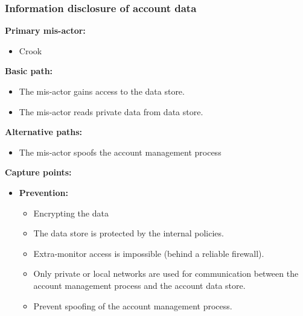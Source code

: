 \documentclass[a4paper,11pt]{report}
\begin{document}
\subsubsection{Information disclosure of account data}
\label{AccountDataCasesI}
\textbf{Primary mis-actor:}
\begin{itemize}
\item Crook
\end{itemize}
\textbf{Basic path:}
\begin{itemize}
\item The mis-actor gains access to the data store.
\item The mis-actor reads private data from data store.
\end{itemize}
\textbf{Alternative paths:}
\begin{itemize}
\item The mis-actor spoofs the account management process
\end{itemize}
\textbf{Capture points:}
\begin{itemize}
\item \textbf{Prevention:}
\begin{itemize}
\item Encrypting the data
\item The data store is protected by the internal policies.
\item Extra-monitor access is impossible (behind a reliable firewall).
\item Only private or local networks are used for communication between the account management process
and the account data store.
\item Prevent spoofing of the account management process.
\end{itemize}
\end{itemize}
\end{document}
